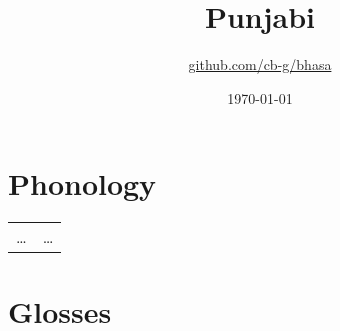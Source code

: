 \documentclass{article}
\title{Punjabi\\\ipa{[p@\textltailn"\t{\textdyoghlig}a\u{b}.bi]}}
\author{\href{https://github.com/cb-g/bhasa}{github.com/cb-g/bhasa}}
\date{\today}
\begin{document}
\pagecolor{custom_bg}\color{custom_fg}
\maketitle\thispagestyle{empty}

\newpage\setcounter{page}{1}\section{Phonology}

\begin{table}[H]
  \color{custom_fg}
  \begin{tabular}{ll}
    \dots & \dots \\
  \end{tabular}
\end{table}

\newpage\section{Glosses}
\end{document}
